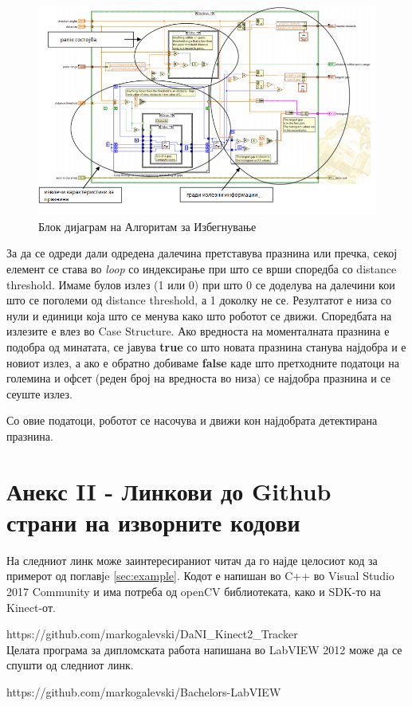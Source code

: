 \documentclass[12pt]{article}
\begin{document}
  \begin{figure}[H]
    \includegraphics[width=0.75\linewidth]{vfh_block_diagram.png}
    \centering
    \caption{Блок дијаграм на Алгоритам за Избегнување}
    \label{fig:vfh_block_diagram.png}
    \end{figure}

  За да се одреди дали одредена далечина претставува празнина или пречка, секој елемент се става во \textit{loop} со индексирање при што се врши споредба со distance threshold. Имаме булов излез (1 или 0) при што 0 се доделува на далечини кои што се поголеми од distance threshold, а 1 доколку не се. Резултатот е низа со нули и единици која што се менува како што роботот се движи. Споредбата на излезите е влез во Case Structure. Ако вредноста на моменталната празнина е подобра од минатата, се јавува \textbf{true} со што новата празнина станува најдобра и е новиот излез, а ако е обратно добиваме \textbf{false} каде што претходните податоци на големина и офсет (реден број на вредноста во низа) се најдобра празнина и се сеуште излез.

  Со овие податоци, роботот се насочува и движи кон најдобрата детектирана празнина.
\newpage
\section{Анекс II - Линкови до Github страни на изворните кодови}
    На следниот линк може заинтересираниот читач да го најде целосиот код за примерот од поглавјe \ref{sec:example}. Кодот е напишан во C++ во Visual Studio 2017 Community и има потреба од openCV библиотеката, како и SDK-то на Kinect-от.

    https://github.com/markogalevski/DaNI\_Kinect2\_Tracker
    \\
    Целата програма за дипломската работа напишана во LabVIEW 2012 може да се спушти од следниот линк.

    https://github.com/markogalevski/Bachelors-LabVIEW
\end{document}
